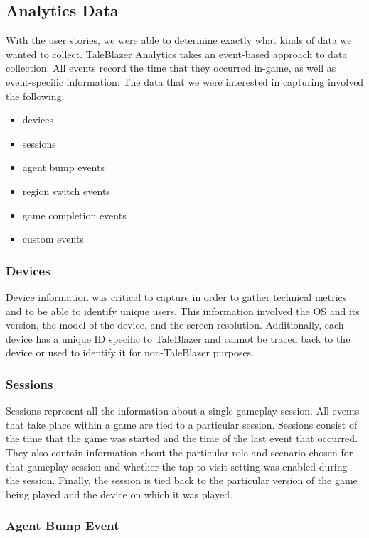 \subsection{Analytics Data}

With the user stories, we were able to determine exactly what kinds of data we wanted to collect. TaleBlazer Analytics takes an event-based approach to data collection. All events record the time that they occurred in-game, as well as event-specific information. The data that we were interested in capturing involved the following:
	\begin{itemize}
		\item devices
		\item sessions
		\item agent bump events
		\item region switch events
		\item game completion events
		\item custom events
	\end{itemize}

\subsubsection{Devices}

Device information was critical to capture in order to gather technical metrics and to be able to identify unique users. This information involved the OS and its version, the model of the device, and the screen resolution. Additionally, each device has a unique ID specific to TaleBlazer and cannot be traced back to the device or used to identify it for non-TaleBlazer purposes.

\subsubsection{Sessions}

Sessions represent all the information about a single gameplay session. All events that take place within a game are tied to a particular session. Sessions consist of the time that the game was started and the time of the last event that occurred. They also contain information about the particular role and scenario chosen for that gameplay session and whether the tap-to-visit setting was enabled during the session. Finally, the session is tied back to the particular version of the game being played and the device on which it was played.

\subsubsection{Agent Bump Event}

